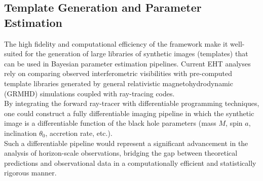 \documentclass[11pt]{book}
\begin{document}
\subsection{Template Generation and Parameter Estimation}

The high fidelity and computational efficiency of the framework make it well-suited for the generation of large libraries of synthetic images (templates) that can be used in Bayesian parameter estimation pipelines. Current EHT analyses rely on comparing observed interferometric visibilities with pre-computed template libraries generated by general relativistic magnetohydrodynamic (GRMHD) simulations coupled with ray-tracing codes.\\
By integrating the forward ray-tracer with differentiable programming techniques, one could construct a fully differentiable imaging pipeline in which the synthetic image is a differentiable function of the black hole parameters (mass $M$, spin $a$, inclination $\theta_0$, accretion rate, etc.).\\
Such a differentiable pipeline would represent a significant advancement in the analysis of horizon-scale observations, bridging the gap between theoretical predictions and observational data in a computationally efficient and statistically rigorous manner.
\newpage



\end{document}
